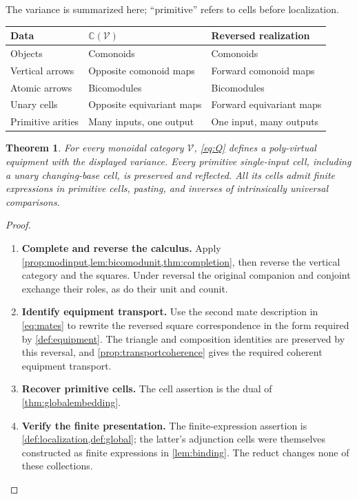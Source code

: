 \documentclass[11pt,reqno]{amsart}
\theoremstyle{plain}
\newtheorem{theorem}{Theorem}[section]
\theoremstyle{definition}
\theoremstyle{remark}
\numberwithin{equation}{section}
\newcommand{\V}{\mathcal V}
\newcommand{\Ccal}{\mathbb C}
\begin{document}
The variance is summarized here; ``primitive'' refers to cells before
localization.
\begin{center}
\small
\begin{tabular}{@{}p{}p{}p{}@{}}
\toprule
Data & $\Ccal(\V)$ & Reversed realization\\
\midrule
Objects & Comonoids & Comonoids\\
Vertical arrows & Opposite comonoid maps & Forward comonoid maps\\
Atomic arrows & Bicomodules & Bicomodules\\
Unary cells & Opposite equivariant maps & Forward equivariant maps\\
Primitive arities & Many inputs, one output & One input, many outputs\\
\bottomrule
\end{tabular}
\end{center}

\begin{theorem}\label{thm:arbitraryV}
For every monoidal category $\V$, \cref{eq:Q} defines a poly-virtual
equipment with the displayed variance. Every primitive single-input
cell, including a unary changing-base cell, is preserved and reflected.
All its cells admit finite expressions in primitive cells, pasting, and
inverses of intrinsically universal comparisons.
\end{theorem}
\begin{proof}\leavevmode
\begin{enumerate}
\item \textbf{Complete and reverse the calculus.} Apply \cref{prop:modinput,lem:bicomodunit,thm:completion}, then
reverse the vertical category and the squares. Under reversal the
original companion and conjoint exchange their roles, as do their unit
and counit.

\item \textbf{Identify equipment transport.} Use the second mate description in \cref{eq:mates} to
rewrite the reversed square correspondence in the form required by
\cref{def:equipment}. The triangle and composition identities are
preserved by this reversal, and \cref{prop:transportcoherence} gives the
required coherent equipment transport.

\item \textbf{Recover primitive cells.} The cell assertion is the
dual of \cref{thm:globalembedding}.

\item \textbf{Verify the finite presentation.} The finite-expression assertion
is \cref{def:localization,def:global}; the latter's adjunction cells
were themselves constructed as finite expressions in
\cref{lem:binding}. The reduct changes none of these collections.\qedhere
\end{enumerate}
\end{proof}
\end{document}
